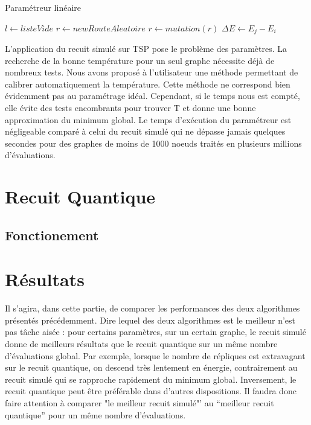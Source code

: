 \documentclass{article}%
\begin{document}
	\begin{algorithm}[!h] 
	\caption{Paramétreur linéaire}
	\begin{algorithmic}
	
	\STATE $ l \leftarrow{listeVide} $
		\STATE $ r \leftarrow{new RouteAleatoire} $
		\STATE $r \leftarrow mutation( r ) $
		\STATE $\Delta{E} \leftarrow E_j-E_i$
		\ENDIF
	\ENDFOR
	\end{algorithmic}
	\end{algorithm}
	
	L'application du recuit simulé sur TSP pose le problème des paramètres. La recherche de la bonne température pour un seul graphe nécessite déjà de nombreux tests. Nous avons proposé à l'utilisateur une méthode permettant de calibrer automatiquement la température. Cette méthode ne correspond bien évidemment pas au paramétrage idéal. Cependant, si le temps nous est compté, elle évite des tests encombrants pour trouver T et donne une bonne approximation du minimum global. Le temps d'exécution du paramétreur est négligeable comparé à celui du recuit simulé qui ne dépasse jamais quelques secondes pour des graphes de moins de 1000 noeuds traités en plusieurs millions d'évaluations.
	
	
\clearpage
\section{Recuit Quantique}
\subsection{Fonctionement}


\clearpage
\section{Résultats}

\vspace{1cm}

		Il s'agira, dans cette partie, de comparer les performances des deux algorithmes présentés précédemment. Dire lequel des deux algorithmes est le meilleur n'est pas tâche aisée : pour certains paramètres, sur un certain graphe, le recuit simulé donne de meilleurs résultats que le recuit quantique sur un même nombre d'évaluations global. Par exemple, lorsque le nombre de répliques est extravagant sur le recuit quantique, on descend très lentement en énergie, contrairement au recuit simulé qui se rapproche rapidement du minimum global. Inversement, le recuit quantique peut être préférable dans d'autres dispositions. Il faudra donc faire attention à comparer "le meilleur recuit simulé"' au "`meilleur recuit quantique"' pour un même nombre d'évaluations.
		
\end{document}
